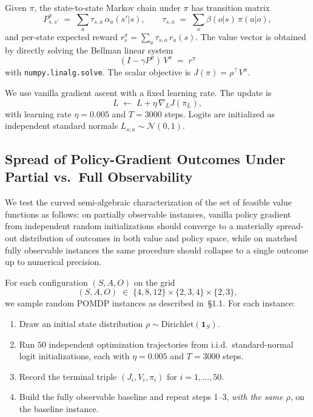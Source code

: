 \documentclass{article}
\theoremstyle{definition}
\theoremstyle{remark}
\begin{document}
Given $\pi$, the state-to-state Markov chain under $\pi$ has transition matrix
\[
  P^\pi_{s,s'} \;=\; \sum_{a} \tau_{s,a} \, \alpha_a(s'  |  s),
  \qquad
  \tau_{s,a} \;=\; \sum_{o} \beta(o  |  s)\, \pi(a | o),
\]
and per-state expected reward $r^\pi_s = \sum_a \tau_{s,a}\, r_a(s)$. The value vector is obtained by directly solving the Bellman linear system
\[
  (I - \gamma P^\pi)\, V^\pi \;=\; r^\pi
\] 
with \texttt{numpy.linalg.solve}. The scalar objective is $J(\pi) = \rho^\top V^\pi$.


We use vanilla gradient ascent with a fixed learning rate. The update is
\[
  L \;\leftarrow\; L + \eta\, \nabla_L J(\pi_L),
\]
with learning rate $\eta = 0.005$ and $T = 3000$ steps. Logits are initialized as independent standard normals $L_{o,a} \sim \mathcal{N}(0,1)$. 

\subsection{Spread of Policy-Gradient Outcomes Under Partial vs.\ Full Observability}
\label{app:experiment-A}

We test the curved semi-algebraic characterization of the set of feasible value functions as follows: 
on partially observable instances, vanilla policy gradient from independent random initializations should converge to a
materially spread-out distribution of outcomes in both value and policy space, while on matched fully observable instances the same procedure should collapse to a single outcome up to numerical precision. 
 
For each configuration $(S, A, O)$ on the grid
\[
  (S, A, O) \;\in\; \{4, 8, 12\} \times \{2, 3, 4\} \times \{2, 3\},
\]
we sample random POMDP instances as described in~\S1.1. For each instance:
 
\begin{enumerate}
  \item Draw an initial state distribution
        $\rho \sim \mathrm{Dirichlet}(\mathbf{1}_S)$.
  \item Run $50$ independent optimization trajectories from i.i.d.\
        standard-normal logit initializations, each with $\eta = 0.005$ and
        $T = 3000$ steps.
  \item Record the terminal triple $(J_i, V_i, \pi_i)$ for $i = 1, \dots, 50$.
  \item Build the fully observable baseline 
  and repeat steps 1--3,
        \emph{with the same $\rho$}, on the baseline instance.
\end{enumerate}
 
\end{document}
